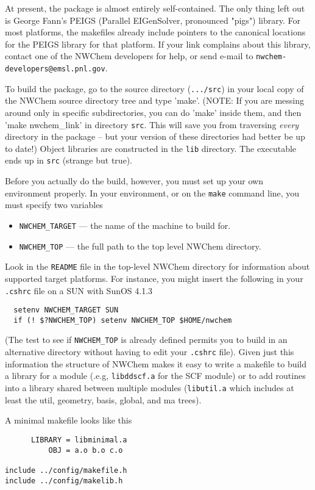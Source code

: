 At present, the package is almost entirely self-contained.  The only
thing left out is George Fann's PEIGS (Parallel EIGenSolver,
pronounced "pigs") library.  For most platforms, the makefiles already
include pointers to the canonical locations for the PEIGS library for
that platform.  If your link complains about this library, contact one
of the NWChem developers for help, or send e-mail to 
{\tt nwchem-developers@emsl.pnl.gov}.

To build the package, go to the source directory ({\tt .../src}) in your
local copy of the NWChem source directory tree and type 'make'.  (NOTE:
If you are messing
around only in specific subdirectories, you can do 'make' inside them, and
then 'make nwchem\_link' in directory {\tt src}.  This will save you from traversing
{\em every} directory in the package -- but your version of these directories
had better be up to date!)
Object libraries are constructed in the {\tt lib} directory.  The executable
ends up in {\tt src} (strange but true).

Before you actually do the build, however, you must set up your own
environment properly.
In your environment, or on the {\tt make} command line, you must specify two
variables
\begin{itemize}
\item {\tt NWCHEM\_TARGET} --- the name of the machine to build for.
\item {\tt NWCHEM\_TOP} --- the full path to the top level NWChem
  directory.
\end{itemize}
Look in the {\tt README} file in the top-level NWChem directory for
information about supported target platforms.  For instance, you might
insert the following in your \verb+.cshrc+ file on a SUN with SunOS
4.1.3 
\begin{verbatim}
  setenv NWCHEM_TARGET SUN
  if (! $?NWCHEM_TOP) setenv NWCHEM_TOP $HOME/nwchem
\end{verbatim}
(The test to see if \verb+NWCHEM_TOP+ is already defined permits you
to build in an alternative directory without having to edit your
\verb+.cshrc+ file).  Given just this information the structure of
NWChem makes it easy to write a makefile to build a library for a
module (.e.g, {\tt libddscf.a} for the SCF module) or to add routines
into a library shared between multiple modules ({\tt libutil.a}
which includes at least the util, geometry, basis, global, and ma
trees).

A minimal makefile looks like this
\begin{verbatim}
      LIBRARY = libminimal.a
          OBJ = a.o b.o c.o

include ../config/makefile.h
include ../config/makelib.h
\end{verbatim}

